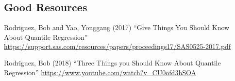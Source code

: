 \documentclass[12pt]{notes}
\begin{document}
\subsection{Good Resources}
\bi
\item Rodriguez, Bob and Yao, Yonggang (2017) “Give Things You Should Know About Quantile Regression” \url{https://support.sas.com/resources/papers/proceedings17/SAS0525-2017.pdf} 
\item Rodriguez, Bob (2018) “Three Things you Should Know About Quantile Regression” \url{https://www.youtube.com/watch?v=CU0ofd3hSOA} 
\ei
\end{document}
